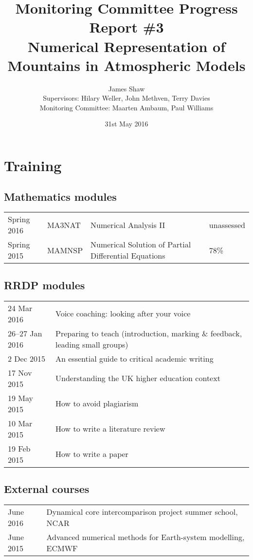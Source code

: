 \documentclass[a4paper,11pt]{article}
\title{Monitoring Committee Progress Report \#3\\
\vspace*{1em}
\Large{Numerical Representation of Mountains in Atmospheric Models}}
\author{James Shaw
\vspace{0.5em} \\
\large{Supervisors: Hilary Weller, John Methven, Terry Davies}
\vspace{0.5em} \\
\large{Monitoring Committee: Maarten Ambaum, Paul Williams}}
\date{31st May 2016}
\begin{document}
\newcommand{\exner}{\Pi}
\maketitle

\section{Training}
\subsection*{Mathematics modules}
\begin{tabular}{l l l l}
Spring 2016	& MA3NAT & Numerical Analysis II & unassessed \\
Spring 2015	& MAMNSP & Numerical Solution of Partial Differential Equations  & 78\% \\
\end{tabular}

\subsection*{RRDP modules}
\begin{tabular}{l l}
24 Mar 2016	& Voice coaching: looking after your voice \\
26--27 Jan 2016 & Preparing to teach (introduction, marking \& feedback, leading small groups) \\
2 Dec 2015	& An essential guide to critical academic writing \\
17 Nov 2015	& Understanding the UK higher education context \\
19 May 2015	& How to avoid plagiarism \\
10 Mar 2015	& How to write a literature review \\
19 Feb 2015	& How to write a paper \\
\end{tabular}

\subsection*{External courses}
\begin{tabular}{l l}
June 2016 & Dynamical core intercomparison project summer school, NCAR \\
June 2015 & Advanced numerical methods for Earth-system modelling, ECMWF \\
\end{tabular}
\end{document}
